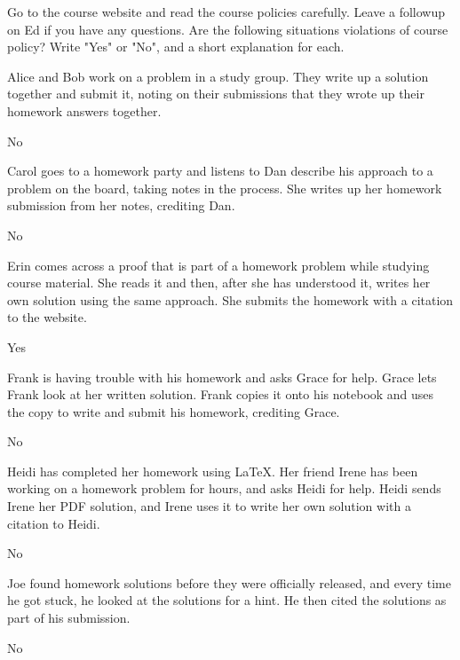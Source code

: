 \documentclass[11pt]{article}
\begin{document}

Go to the course website and read the course policies carefully. Leave a followup on Ed if you have any questions. Are the following situations violations of course policy? Write "Yes" or "No", and a short explanation for each.

\begin{Parts}
  \Part Alice and Bob work on a problem in a study group. They write up a solution together and submit it, noting on their submissions that they wrote up their homework answers together. 
  \begin{solution}
    No
\end{solution}
  
  \Part Carol goes to a homework party and listens to Dan describe his approach to a problem on the board, taking notes in the process. She writes up her homework submission from her notes, crediting Dan.
  \begin{solution}
    No
\end{solution}
  
  \Part Erin comes across a proof that is part of a homework problem while studying course material. She reads it and then, after she has understood it, writes her own solution using the same approach. She submits the homework with a citation to the website.
  \begin{solution}
    Yes
\end{solution}
  
  \Part Frank is having trouble with his homework and asks Grace for help. Grace lets Frank look at her written solution. Frank copies it onto his notebook and uses the copy to write and submit his homework, crediting Grace.
  \begin{solution}
    No
\end{solution}
  
  \Part Heidi has completed her homework using \LaTeX. Her friend Irene has been working on a homework problem for hours, and asks Heidi for help. Heidi sends Irene her PDF solution, and Irene uses it to write her own solution with a citation to Heidi.
  \begin{solution}
    No
\end{solution}
  
  \Part
  Joe found homework solutions before they were officially released, and every time he got stuck, he looked at the solutions for a hint. He then cited the solutions as part of his submission.
  \begin{solution}
    No
\end{solution}
\end{Parts}
\end{document}
